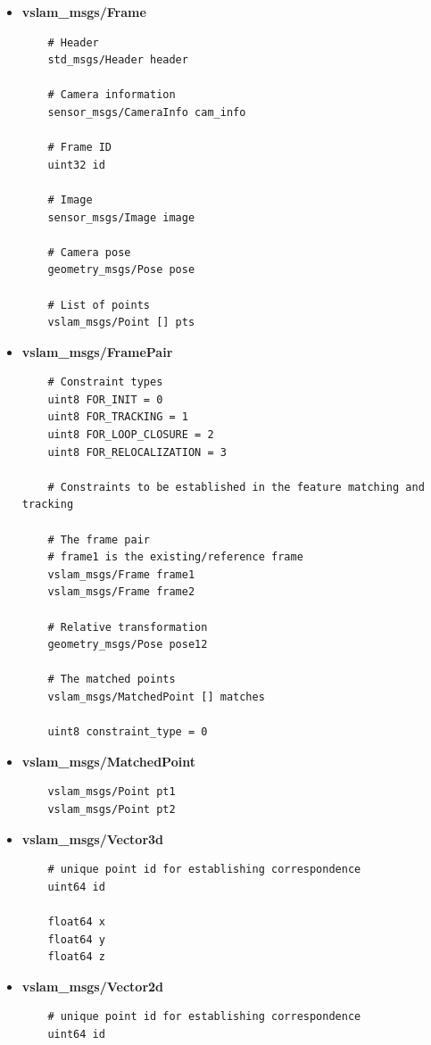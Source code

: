 \begin{itemize}
  \item \textbf{vslam\_msgs/Frame}
  \begin{verbatim}
    # Header
    std_msgs/Header header

    # Camera information
    sensor_msgs/CameraInfo cam_info

    # Frame ID
    uint32 id 

    # Image
    sensor_msgs/Image image
    
    # Camera pose
    geometry_msgs/Pose pose
    
    # List of points
    vslam_msgs/Point [] pts
  \end{verbatim}

  \item \textbf{vslam\_msgs/FramePair}
  \begin{verbatim}
    # Constraint types
    uint8 FOR_INIT = 0
    uint8 FOR_TRACKING = 1
    uint8 FOR_LOOP_CLOSURE = 2
    uint8 FOR_RELOCALIZATION = 3

    # Constraints to be established in the feature matching and tracking 

    # The frame pair
    # frame1 is the existing/reference frame
    vslam_msgs/Frame frame1
    vslam_msgs/Frame frame2

    # Relative transformation
    geometry_msgs/Pose pose12

    # The matched points
    vslam_msgs/MatchedPoint [] matches

    uint8 constraint_type = 0
  \end{verbatim}

  \item \textbf{vslam\_msgs/MatchedPoint}
  \begin{verbatim}
    vslam_msgs/Point pt1    
    vslam_msgs/Point pt2
  \end{verbatim}

  \item \textbf{vslam\_msgs/Vector3d}
  \begin{verbatim}
    # unique point id for establishing correspondence
    uint64 id

    float64 x
    float64 y  
    float64 z 
  \end{verbatim}

  \item \textbf{vslam\_msgs/Vector2d}
  \begin{verbatim}
    # unique point id for establishing correspondence
    uint64 id


\end{verbatim}
\end{itemize}

